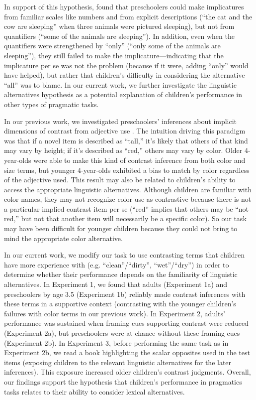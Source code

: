 \documentclass[10pt,letterpaper]{article}
\begin{document}
In support of this hypothesis,  found that preschoolers could make implicatures from familiar scales like numbers and from explicit descriptions (``the cat and the cow are sleeping'' when three animals were pictured sleeping), but not from quantifiers (``some of the animals are sleeping''). In addition, even when the quantifiers were strengthened by ``only'' (``only some of the animals are sleeping''), they still failed to make the implicature---indicating that the implicature per se was not the problem (because if it were, adding ``only'' would have helped), but rather that children's difficulty in considering the alternative ``all'' was to blame.  In our current work, we further investigate the linguistic alternatives hypothesis as a potential explanation of children's performance in other types of pragmatic tasks.  

In our previous work, we investigated preschoolers' inferences about implicit dimensions of contrast from adjective use \cite{horowitz2012}. The intuition driving this paradigm was that if a novel item is described as ``tall,'' it's likely that others of that kind may vary by height; if it's described as ``red,'' others may vary by color. Older 4-year-olds were able to make this kind of contrast inference from both color and size terms, but younger 4-year-olds exhibited a bias to match by color regardless of the adjective used. This result may also be related to children's ability to access the appropriate linguistic alternatives. Although children are familiar with color names, they may not recognize color use as contrastive because there is not a particular implied contrast item per se (``red'' implies that others may be ``not red,'' but not that another item will necessarily be a specific color). So our task may have been difficult for younger children because they could not bring to mind the appropriate color alternative. 

In our current work, we modify our task to use contrasting terms that children have more experience with (e.g. ``clean''/``dirty'', ``wet''/``dry'') in order to determine whether their performance depends on the familiarity of linguistic alternatives. In Experiment 1, we found that adults (Experiment 1a) and preschoolers by age 3.5 (Experiment 1b) reliably made contrast inferences with these terms in a supportive context (contrasting with the younger children's failures with color terms in our previous work).  In Experiment 2, adults' performance was sustained when framing cues supporting contrast were reduced (Experiment 2a), but preschoolers were at chance without these framing cues (Experiment 2b).  In Experiment 3, before performing the same task as in Experiment 2b, we read a book highlighting the scalar opposites used in the test items (exposing children to the relevant linguistic alternatives for the later inferences). This exposure increased older children's contrast judgments.  Overall, our findings support the hypothesis that children's performance in pragmatics tasks relates to their ability to consider lexical alternatives.
\end{document}
